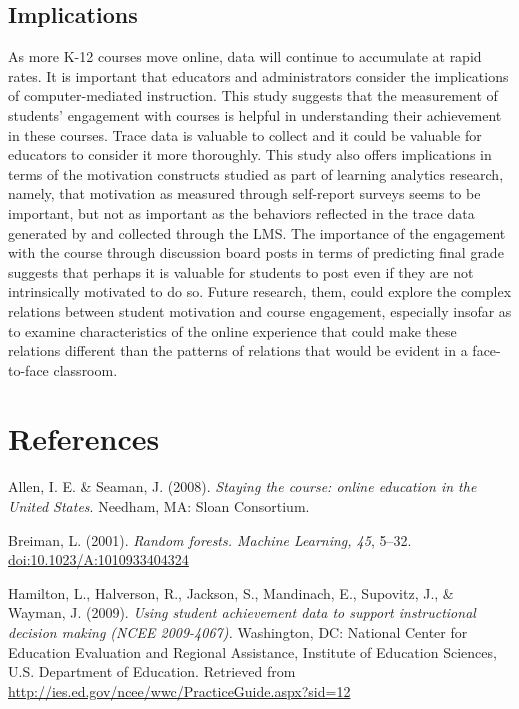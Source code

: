 \documentclass[acmart]{apa6}
\theoremstyle{definition}
\theoremstyle{definition}
\theoremstyle{definition}
\theoremstyle{remark}
\begin{document}
\subsection{Implications}\label{implications}

As more K-12 courses move online, data will continue to accumulate at
rapid rates. It is important that educators and administrators consider
the implications of computer-mediated instruction. This study suggests
that the measurement of students' engagement with courses is helpful in
understanding their achievement in these courses. Trace data is valuable
to collect and it could be valuable for educators to consider it more
thoroughly. This study also offers implications in terms of the
motivation constructs studied as part of learning analytics research,
namely, that motivation as measured through self-report surveys seems to
be important, but not as important as the behaviors reflected in the
trace data generated by and collected through the LMS. The importance of
the engagement with the course through discussion board posts in terms
of predicting final grade suggests that perhaps it is valuable for
students to post even if they are not intrinsically motivated to do so.
Future research, them, could explore the complex relations between
student motivation and course engagement, especially insofar as to
examine characteristics of the online experience that could make these
relations different than the patterns of relations that would be evident
in a face-to-face classroom.

\section{References}\label{references}

\begingroup
\setlength{\parindent}{-0.5in} \setlength{\leftskip}{0.5in}

Allen, I. E. \& Seaman, J. (2008). \emph{Staying the course: online
education in the United States}. Needham, MA: Sloan Consortium.

Breiman, L. (2001). \emph{Random forests. Machine Learning, 45}, 5--32.
\url{doi:10.1023/A:1010933404324}

Hamilton, L., Halverson, R., Jackson, S., Mandinach, E., Supovitz, J.,
\& Wayman, J. (2009). \emph{Using student achievement data to support
instructional decision making (NCEE 2009-4067).} Washington, DC:
National Center for Education Evaluation and Regional Assistance,
Institute of Education Sciences, U.S. Department of Education. Retrieved
from \url{http://ies.ed.gov/ncee/wwc/PracticeGuide.aspx?sid=12}
\end{document}
